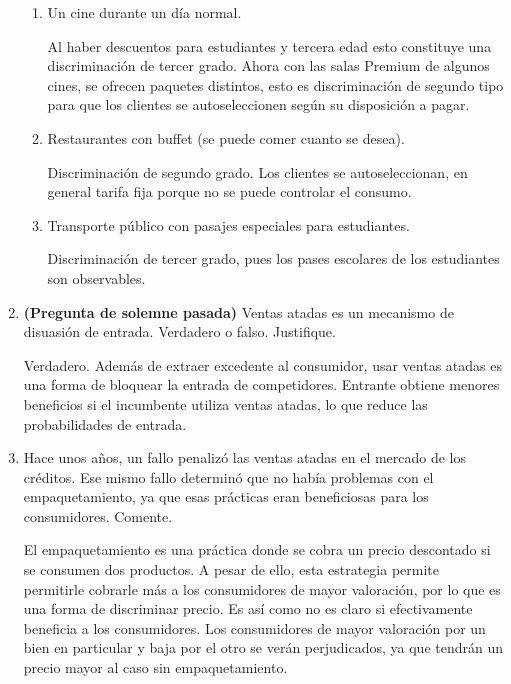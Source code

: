 \documentclass{exam}
\begin{document}
\begin{enumerate}
    \begin{enumerate}
        \item Un cine durante un día normal.
        \begin{solution}
            Al haber descuentos para estudiantes y tercera edad esto constituye una discriminación de tercer grado. Ahora con las salas Premium de algunos cines, se ofrecen paquetes distintos, esto es discriminación de segundo tipo para que los clientes se autoseleccionen según su disposición a pagar.
        \end{solution}
        \item Restaurantes con buffet (se puede comer cuanto se desea).
        \begin{solution}
            Discriminación de segundo grado. Los clientes se autoseleccionan, en general tarifa fija porque no se puede controlar el consumo.
        \end{solution}
        \item Transporte público con pasajes especiales para estudiantes.
        \begin{solution}
            Discriminación de tercer grado, pues los pases escolares de los estudiantes son observables.
        \end{solution}
    \end{enumerate}
    \item \textbf{(Pregunta de solemne pasada)} Ventas atadas es un mecanismo de disuasión de entrada. Verdadero o falso. Justifique.
        \begin{solution}
            Verdadero. Además de extraer excedente al consumidor, usar ventas atadas es una forma de bloquear la entrada de competidores. Entrante obtiene menores beneficios si el incumbente utiliza ventas atadas, lo que reduce las probabilidades de entrada.
        \end{solution}
    \item Hace unos años, un fallo penalizó las ventas atadas en el mercado de los créditos. Ese mismo fallo determinó que no había problemas con el empaquetamiento, ya que esas prácticas eran beneficiosas para los consumidores. Comente.
    \begin{solution}
        El empaquetamiento es una práctica donde se cobra un precio descontado si se consumen dos productos. A pesar de ello, esta estrategia permite permitirle cobrarle más a los consumidores de mayor valoración, por lo que es una forma de discriminar precio. Es así como no es claro si efectivamente beneficia a los consumidores. Los consumidores de mayor valoración por un bien en particular y baja por el otro se verán perjudicados, ya que tendrán un precio mayor al caso sin empaquetamiento.

\end{solution}
\end{enumerate}
\end{document}

